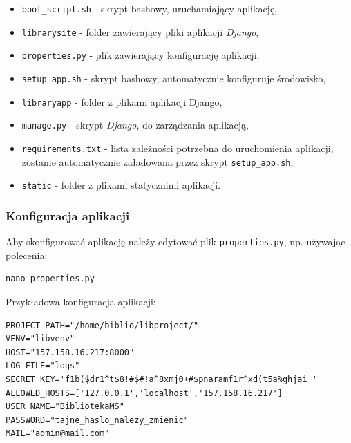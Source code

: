 \documentclass[twoside]{projektInzynierskiMS}
\begin{document}
\begin{itemize}
	\item \verb`boot_script.sh` - skrypt bashowy, uruchamiający aplikację,
	\item \verb`librarysite` - folder zawierający pliki aplikacji \textit{Django},
	\item \verb`properties.py` - plik zawierający konfigurację aplikacji,
	\item \verb`setup_app.sh` - skrypt bashowy, automatycznie konfiguruje środowisko,
	\item \verb`libraryapp` - folder z plikami aplikacji Django,
	\item \verb`manage.py` - skrypt \textit{Django}, do zarządzania aplikacją,
	\item \verb`requirements.txt` - lista zależności potrzebna do uruchomienia aplikacji, zostanie automatycznie załadowana przez skrypt \verb`setup_app.sh`,
	\item \verb`static` - folder z plikami statycznimi aplikacji.
\end{itemize}



\subsubsection{Konfiguracja aplikacji}

Aby skonfigurować aplikację należy edytować plik \verb`properties.py`, np. używając polecenia:
\begin{verbatim}
nano properties.py
\end{verbatim}

Przykładowa konfiguracja aplikacji:
\begin{verbatim}
PROJECT_PATH="/home/biblio/libproject/"
VENV="libvenv"
HOST="157.158.16.217:8000"
LOG_FILE="logs"
SECRET_KEY='f1b($dr1^t$8!#$#!a^8xmj0+#$pnaramf1r^xd(t5a%ghjai_'
ALLOWED_HOSTS=['127.0.0.1','localhost','157.158.16.217']
USER_NAME="BibliotekaMS"
PASSWORD="tajne_haslo_nalezy_zmienic"
MAIL="admin@mail.com"
\end{verbatim}
\end{document}
